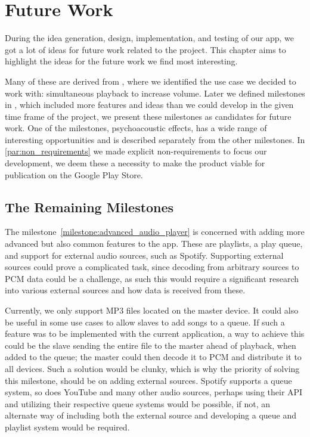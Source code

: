\chapter{Future Work}\label{cha:future_work}
During the idea generation, design, implementation, and testing of our app, we got a lot of ideas for future work related to the project.
This chapter aims to highlight the ideas for the future work we find most interesting.

Many of these are derived from , where we identified the use case we decided to work with: simultaneous playback to increase volume.
Later we defined milestones in , which included more features and ideas than we could develop in the given time frame of the project, we present these milestones as candidates for future work.
One of the milestones, psychoacoustic effects, has a wide range of interesting opportunities and is described separately from the other milestones.
In \cref{par:non_requirements} we made explicit non-requirements to focus our development, we deem these a necessity to make the product viable for publication on the Google Play Store.

\section{The Remaining Milestones}
The milestone~\ref{milestone:advanced_audio_player} is concerned with adding more advanced but also common features to the app.
These are playlists, a play queue, and support for external audio sources, such as Spotify.
Supporting external sources could prove a complicated task, since decoding from arbitrary sources to \ac{PCM} data could be a challenge, as such this would require a significant research into various external sources and how data is received from these.

Currently, we only support MP3 files located on the master device.
It could also be useful in some use cases to allow slaves to add songs to a queue.
If such a feature was to be implemented with the current application, a way to achieve this could be the slave sending the entire file to the master ahead of playback, when added to the queue; the master could then decode it to \ac{PCM} and distribute it to all devices.
Such a solution would be clunky, which is why the priority of solving this milestone, should be on adding external sources.
Spotify supports a queue system, so does YouTube and many other audio sources, perhaps using their API and utilizing their respective queue systems would be possible, if not, an alternate way of including both the external source and developing a queue and playlist system would be required.

